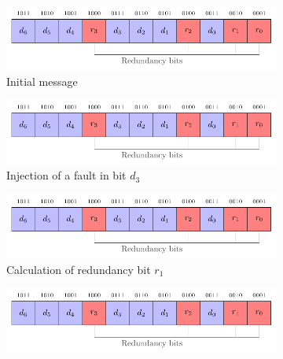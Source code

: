 \begin{figure}[ht]
    \centering
    \begin{subfigure}[b]{0.49\textwidth}
        \includegraphics[width=\textwidth, page=11]{c5_countermeasures_dift/img/hamming_bit.pdf}
        \caption{Initial message}
        \label{fig:hamming_code_faulted_1}
    \end{subfigure}
    \hfill
    \begin{subfigure}[b]{0.49\textwidth}
        \includegraphics[width=\textwidth, page=12]{c5_countermeasures_dift/img/hamming_bit.pdf}
        \caption{Injection of a fault in bit $d_3$}
        \label{fig:hamming_code_faulted_2}
    \end{subfigure}
    \hfill
    \begin{subfigure}[b]{0.49\textwidth}
        \includegraphics[width=\textwidth, page=13]{c5_countermeasures_dift/img/hamming_bit.pdf}
        \caption{Calculation of redundancy bit $r_1$}
        \label{fig:hamming_code_faulted_3}
    \end{subfigure}
    \hfill
    \begin{subfigure}[b]{0.49\textwidth}
        \includegraphics[width=\textwidth, page=14]{c5_countermeasures_dift/img/hamming_bit.pdf}

\end{subfigure}
\end{figure}
